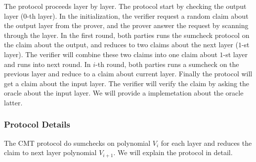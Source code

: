 
The protocol proceeds layer by layer. The protocol start by checking the output layer ($0$-th layer). In the initialization, the verifier request a random claim about the output layer from the prover, and the prover answer the request by scanning through the layer. In the first round, both parties runs the sumcheck protocol on the claim about the output, and reduces to two claims about the next layer ($1$-st layer). The verifier will combine these two claims into one claim about $1$-st layer and runs into next round. In $i$-th round, both parties runs a sumcheck on the previous layer and reduce to a claim about current layer. Finally the protocol will get a claim about the input layer. The verifier will verify the claim by asking the oracle about the input layer. We will provide a implemetation about the oracle latter.

\subsubsection{Protocol Details}\label{sec::gkr}

The CMT protocol do sumchecks on polynomial $V_{i}$ for each layer and reduces the claim to next layer polynomial $V_{i+1}$. We will explain the protocol in detail.

